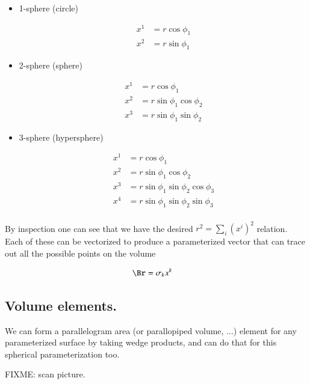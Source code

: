 \documentclass{article}
\begin{document}
\begin{itemize}
\item 1-sphere (circle)

\begin{align*}
x^1 &= r \cos\phi_1 \\
x^2 &= r \sin\phi_1 
\end{align*}

\item 2-sphere (sphere)

\begin{align*}
x^1 &= r \cos\phi_1 \\
x^2 &= r \sin\phi_1 \cos\phi_2 \\
x^3 &= r \sin\phi_1 \sin\phi_2
\end{align*}

\item 3-sphere (hypersphere)

\begin{align*}
x^1 &= r \cos\phi_1 \\
x^2 &= r \sin\phi_1 \cos\phi_2 \\
x^3 &= r \sin\phi_1 \sin\phi_2 \cos\phi_3 \\
x^4 &= r \sin\phi_1 \sin\phi_2 \sin\phi_3 \\
\end{align*}

\end{itemize}

By inspection one can see that we have the desired $r^2 = \sum_i (x^i)^2$ relation.  Each of these can be vectorized to produce
a parameterized vector that can trace out all the possible points on the volume

\begin{align*}
\Br &= \sigma_k x^k 
\end{align*}

\subsection{ Volume elements. }

We can form a parallelogram area (or parallopiped volume, ...) element for any parameterized surface by taking wedge products, and can do that
for this spherical parameterization too.

FIXME: scan picture.

%
\end{document}
